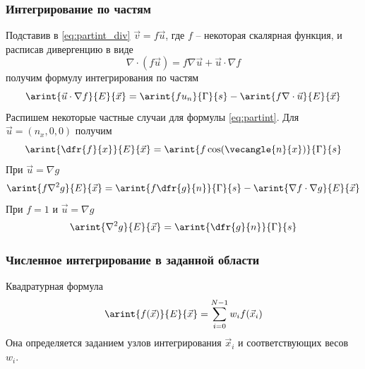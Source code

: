 \subsubsection{Интегрирование по частям}

Подставив в \cref{eq:partint_div} $\vec v = f\vec u$, где $f$ -- некоторая скалярная функция, и 
расписав дивергенцию в виде
$$\nabla\cdot(f\vec u) = f\nabla\vec u + \vec u \cdot \nabla f$$
получим формулу интегрирования по частям
\begin{equation}
\label{eq:partint}
\arint{\vec u \cdot \nabla f}{E}{\vec x} = \arint{f u_n}{\Gamma}{s} - \arint{f\nabla\cdot \vec u}{E}{\vec x}
\end{equation}
Распишем некоторые частные случаи для формулы \cref{eq:partint}.
Для $\vec u = (n_x, 0, 0)$ получим
\begin{equation}
\label{eq:partint_ugrad_}
\arint{\dfr{f}{x}}{E}{\vec x} = \arint{f \cos(\vecangle{n}{x})}{\Gamma}{s}
\end{equation}
При $\vec u = \nabla g$
\begin{equation}
\label{eq:partint_laplace_fg}
\arint{f \nabla^2 g }{E}{\vec x} = \arint{f\dfr{g}{n}}{\Gamma}{s} - \arint{\nabla f \cdot \nabla g}{E}{\vec x}
\end{equation}
При $f=1$ и $\vec u = \nabla g$
\begin{equation}
\label{eq:partint_laplace}
\arint{\nabla^2 g}{E}{\vec x} = \arint{\dfr{g}{n}}{\Gamma}{s}
\end{equation}

\subsubsection{Численное интегрирование в заданной области}
Квадратурная формула
\begin{equation}
\label{eq:quadrature_formula}
\arint{f(\vec x)}{E}{\vec x} = \sum_{i=0}^{N-1} w_i f(\vec x_i)
\end{equation}
Она определяется заданием узлов интегрирования $\vec x_i$ 
и соответствующих весов $w_i$.
